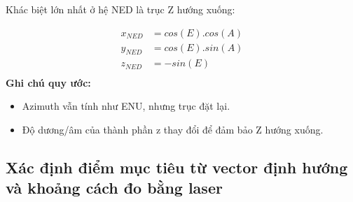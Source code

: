 Khác biệt lớn nhất ở hệ NED là trục Z hướng xuống:

$$
\begin{aligned}
x_{NED} &= cos(E).cos(A) \\
y_{NED} &= cos(E).sin(A) \\
z_{NED} &= - sin(E) \\
\end{aligned}
$$
\textbf{Ghi chú quy ước:}
\begin{itemize}
    \item Azimuth vẫn tính như ENU, nhưng trục đặt lại.
    \item Độ dương/âm của thành phần z thay đổi để đảm bảo Z hướng xuống.
\end{itemize}

\subsection{Xác định điểm mục tiêu từ vector định hướng và khoảng cách đo bằng laser}
